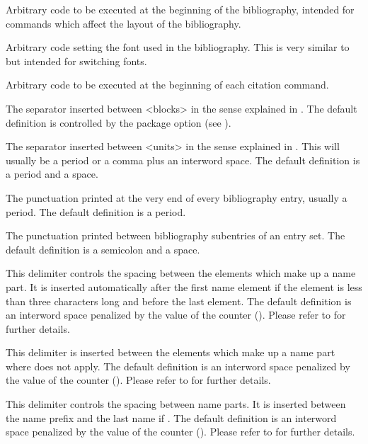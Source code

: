 \begin{ltxsyntax}

Arbitrary code to be executed at the beginning of the bibliography, intended for commands which affect the layout of the bibliography.

Arbitrary code setting the font used in the bibliography. This is very similar to  but intended for switching fonts.

Arbitrary code to be executed at the beginning of each citation command.

The separator inserted between <blocks> in the sense explained in . The default definition is controlled by the package option  (see ).

The separator inserted between <units> in the sense explained in . This will usually be a period or a comma plus an interword space. The default definition is a period and a space.

The punctuation printed at the very end of every bibliography entry, usually a period. The default definition is a period.

\BiberOnlyMark
The punctuation printed between bibliography subentries of an entry set. The default definition is a semicolon and a space.

\BiberOnlyMark
This delimiter controls the spacing between the elements which make up a name part. It is inserted automatically after the first name element if the element is less than three characters long and before the last element. The default definition is an interword space penalized by the value of the  counter (). Please refer to  for further details.

\BiberOnlyMark
This delimiter is inserted between the elements which make up a name part where  does not apply. The default definition is an interword space penalized by the value of the  counter (). Please refer to  for further details.

This delimiter controls the spacing between name parts. It is inserted between the name prefix and the last name if . The default definition is an interword space penalized by the value of the  counter (). Please refer to  for further details.


\end{ltxsyntax}
